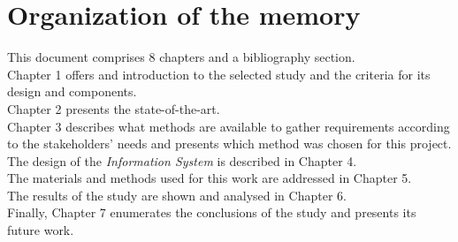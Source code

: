 


\section{Organization of the memory}

This document comprises 8 chapters and a bibliography section.\\

Chapter 1 offers and introduction to the selected study and the criteria for its design and components.\\

Chapter 2 presents the state-of-the-art.\\

Chapter 3 describes what methods are available to gather requirements according to the stakeholders' needs and presents which method was chosen for this project.\\

The design of the \textit{Information System} \cite{information_system, information_system_architecture} is described in Chapter 4.\\

The materials and methods used for this work are addressed in Chapter 5.\\

The results of the study are shown and analysed in Chapter 6.\\

Finally, Chapter 7 enumerates the conclusions of the study and presents its future work.\\

\newpage
\newpage
